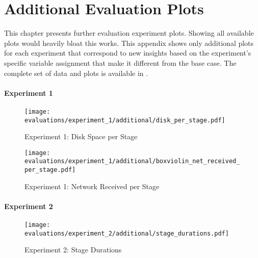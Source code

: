 \chapter{Additional Evaluation Plots}\label{appendix:evaluation_plots}

This chapter presents further evaluation experiment plots.
Showing all available plots would heavily bloat this works.
This appendix shows only additional plots for each experiment that correspond to new insights based on the experiment's specific variable assignment that make it different from the base case.
The complete set of data and plots is available in \cite{cli_code}.

\subsubsection{Experiment 1}

\begin{figure}[H]
    \begin{adjustwidth}{-0.2\paperwidth}{-0.2\paperwidth}
        \centering
        \texttt{[image: evaluations/experiment\_1/additional/disk\_per\_stage.pdf]}
        \caption{Experiment 1: Disk Space per Stage}
        \label{fig:eval_1_disk_space_per_stage}
    \end{adjustwidth}
\end{figure}

\begin{figure}[H]
    \begin{adjustwidth}{-0.2\paperwidth}{-0.2\paperwidth}
        \centering
        \texttt{[image: evaluations/experiment\_1/additional/boxviolin\_net\_received\_per\_stage.pdf]}
        \caption{Experiment 1: Network Received per Stage}
        \label{fig:eval_1_net_received}
    \end{adjustwidth}
\end{figure}

\subsubsection{Experiment 2}

\begin{figure}[H]
    \begin{adjustwidth}{-0.2\paperwidth}{-0.2\paperwidth}
        \centering
        \texttt{[image: evaluations/experiment\_2/additional/stage\_durations.pdf]}
        \caption{Experiment 2: Stage Durations}
        \label{fig:eval_2_stage_durations}
    \end{adjustwidth}
\end{figure}

